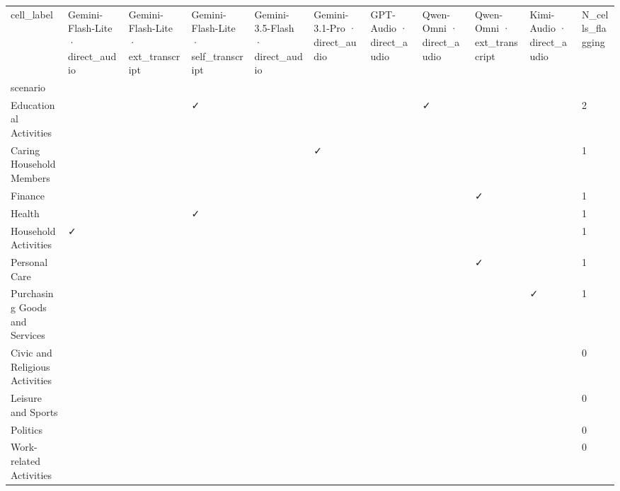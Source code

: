 \begin{tabular}{lllllllllll}
\toprule
cell_label & Gemini-Flash-Lite · direct\_audio & Gemini-Flash-Lite · ext\_transcript & Gemini-Flash-Lite · self\_transcript & Gemini-3.5-Flash · direct\_audio & Gemini-3.1-Pro · direct\_audio & GPT-Audio · direct\_audio & Qwen-Omni · direct\_audio & Qwen-Omni · ext\_transcript & Kimi-Audio · direct\_audio & N\_cells\_flagging \\
scenario &  &  &  &  &  &  &  &  &  &  \\
\midrule
Educational Activities &  &  & ✓ &  &  &  & ✓ &  &  & 2 \\
Caring Household Members &  &  &  &  & ✓ &  &  &  &  & 1 \\
Finance &  &  &  &  &  &  &  & ✓ &  & 1 \\
Health &  &  & ✓ &  &  &  &  &  &  & 1 \\
Household Activities & ✓ &  &  &  &  &  &  &  &  & 1 \\
Personal Care &  &  &  &  &  &  &  & ✓ &  & 1 \\
Purchasing Goods and Services &  &  &  &  &  &  &  &  & ✓ & 1 \\
Civic and Religious Activities &  &  &  &  &  &  &  &  &  & 0 \\
Leisure and Sports &  &  &  &  &  &  &  &  &  & 0 \\
Politics &  &  &  &  &  &  &  &  &  & 0 \\
Work-related Activities &  &  &  &  &  &  &  &  &  & 0 \\
\bottomrule
\end{tabular}

